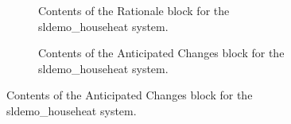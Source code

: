 \documentclass{mcscert}
\newcommand{\sddblks}{SDD Blocks Library}
\begin{document}
\begin{figure}
	\centering
	\caption{Contents of the Rationale and Anticipated Changes \sddblks{} blocks for the sldemo\_househeat system.}\label{fig:househeat-sdd-blocks-2}
	\begin{subfigure}[b]{\textwidth}
		\caption{Contents of the Rationale block for the sldemo\_househeat system.}
		\label{fig:rationale-2}
	\end{subfigure}
	\begin{subfigure}[b]{\textwidth}
		\caption{Contents of the Anticipated Changes block for the sldemo\_househeat system.}
		\label{fig:ant-changes-2}
	\end{subfigure}
\end{figure}
\end{document}
